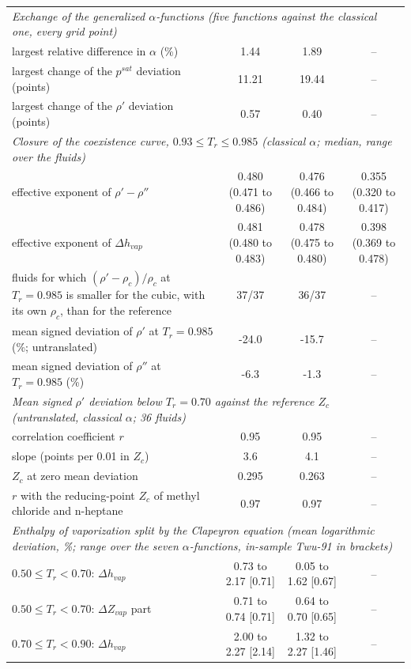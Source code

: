\begin{table}[H]
\begin{tabular}{p{6.2cm}ccc}
\multicolumn{4}{l}{\emph{Exchange of the generalized $\alpha$-functions (five functions against the classical one, every grid point)}} \\
largest relative difference in $\alpha$ (\%) & 1.44 & 1.89 & -- \\
largest change of the $p^{sat}$ deviation (points) & 11.21 & 19.44 & -- \\
largest change of the $\rho'$ deviation (points) & 0.57 & 0.40 & -- \\
\multicolumn{4}{l}{\emph{Closure of the coexistence curve, $0.93 \le T_r \le 0.985$ (classical $\alpha$; median, range over the fluids)}} \\
effective exponent of $\rho' - \rho''$ & 0.480 (0.471 to 0.486) & 0.476 (0.466 to 0.484) & 0.355 (0.320 to 0.417) \\
effective exponent of $\Delta h_{vap}$ & 0.481 (0.480 to 0.483) & 0.478 (0.475 to 0.480) & 0.398 (0.369 to 0.478) \\
fluids for which $(\rho' - \rho_c)/\rho_c$ at $T_r = 0.985$ is smaller for the cubic, with its own $\rho_c$, than for the reference & 37/37 & 36/37 & -- \\
mean signed deviation of $\rho'$ at $T_r = 0.985$ (\%; untranslated) & -24.0 & -15.7 & -- \\
mean signed deviation of $\rho''$ at $T_r = 0.985$ (\%) & -6.3 & -1.3 & -- \\
\multicolumn{4}{l}{\emph{Mean signed $\rho'$ deviation below $T_r = 0.70$ against the reference $Z_c$ (untranslated, classical $\alpha$; 36 fluids)}} \\
correlation coefficient $r$ & 0.95 & 0.95 & -- \\
slope (points per 0.01 in $Z_c$) & 3.6 & 4.1 & -- \\
$Z_c$ at zero mean deviation & 0.295 & 0.263 & -- \\
$r$ with the reducing-point $Z_c$ of methyl chloride and n-heptane & 0.97 & 0.97 & -- \\
\multicolumn{4}{l}{\emph{Enthalpy of vaporization split by the Clapeyron equation (mean logarithmic deviation, \%; range over the seven $\alpha$-functions, in-sample Twu-91 in brackets)}} \\
$0.50 \le T_r < 0.70$: $\Delta h_{vap}$ & 0.73 to 2.17 [0.71] & 0.05 to 1.62 [0.67] & -- \\
$0.50 \le T_r < 0.70$: $\Delta Z_{vap}$ part & 0.71 to 0.74 [0.71] & 0.64 to 0.70 [0.65] & -- \\
$0.70 \le T_r < 0.90$: $\Delta h_{vap}$ & 2.00 to 2.27 [2.14] & 1.32 to 2.27 [1.46] & -- \\

\end{tabular}
\end{table}
